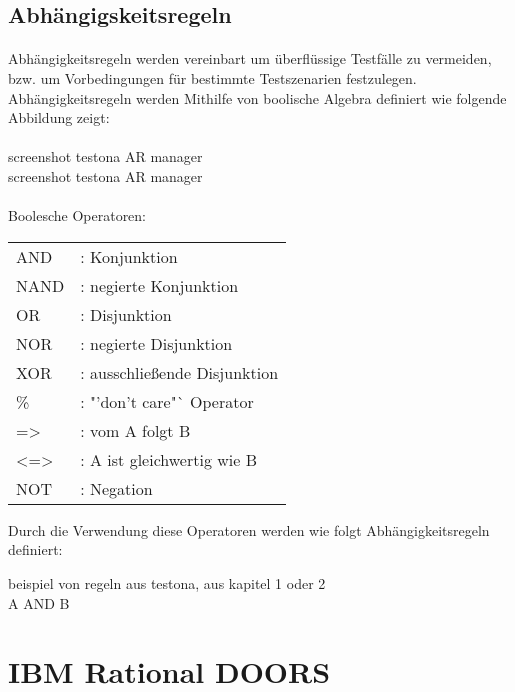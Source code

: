 \subsection{Abhängigskeitsregeln}
\paragraph{}

Abhängigkeitsregeln werden vereinbart um überflüssige Testfälle zu vermeiden, bzw. um Vorbedingungen für bestimmte Testszenarien festzulegen. Abhängigkeitsregeln werden Mithilfe von boolische Algebra definiert wie folgende Abbildung %
zeigt: \\
\\
screenshot testona AR manager\\
screenshot testona AR manager\\
\\
Boolesche Operatoren:\\

\begin{tabular}{ll}
AND &: Konjunktion\\
NAND &: negierte Konjunktion\\
OR &: Disjunktion\\
NOR &: negierte Disjunktion\\
XOR &: ausschließende Disjunktion\\
\% &: "'don't care"` Operator\\
=> &: vom A folgt B\\
<=> &: A ist gleichwertig wie B\\
NOT &: Negation\\
\end{tabular}

Durch die Verwendung diese Operatoren werden wie folgt Abhängigkeitsregeln definiert:\\

\begin{center}
beispiel von regeln aus testona, aus kapitel 1 oder 2\\
A AND B 
\end{center}




\section{IBM Rational DOORS}\label{sec:DOORS}
